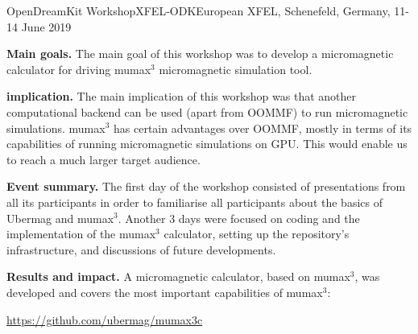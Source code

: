 \begin{event}{OpenDreamKit Workshop}{XFEL-ODK}{European XFEL, Schenefeld, Germany, 11-14 June 2019}

\textbf{Main goals.} The main goal of this workshop was to develop a
micromagnetic calculator for driving mumax$^{3}$ micromagnetic
simulation tool.

\textbf{\ODK implication.} The main implication of this workshop was
that another computational backend can be used (apart from OOMMF) to
run micromagnetic simulations. mumax$^{3}$ has certain advantages over
OOMMF, mostly in terms of its capabilities of running micromagnetic
simulations on GPU. This would enable us to reach a much larger target
audience.

\textbf{Event summary.} The first day of the workshop consisted of
presentations from all its participants in order to familiarise all
participants about the basics of Ubermag and mumax$^{3}$. Another 3
days were focused on coding and the implementation of the mumax$^{3}$
calculator, setting up the repository's infrastructure, and
discussions of future developments.

\textbf{Results and impact.} A micromagnetic calculator, based on
mumax$^{3}$, was developed and covers the most important capabilities
of mumax$^{3}$: \centerline{\url{https://github.com/ubermag/mumax3c}}

\end{event}
